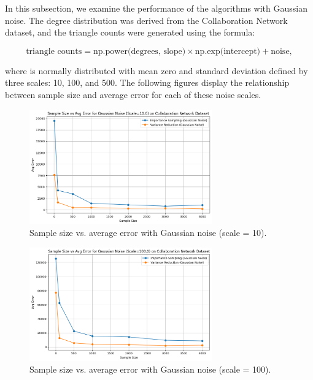 \documentclass[11pt]{article}
\begin{document}
In this subsection, we examine the performance of the algorithms with Gaussian noise. The degree distribution was derived from the Collaboration Network dataset, and the triangle counts were generated using the formula:

\[
\text{triangle counts} = \text{np.power(degrees, slope)} \times \text{np.exp(intercept)} + \text{noise},
\]

where  is normally distributed with mean zero and standard deviation defined by three scales: 10, 100, and 500. The following figures display the relationship between sample size and average error for each of these noise scales.

\begin{figure}[H]
    \centering
    \includegraphics[width=0.7\textwidth]{plots/simulated/percent_error_vs_sample_size_comparison_gaussian_10.0.png}
    \caption{Sample size vs. average error with Gaussian noise (scale = 10).}
    \label{fig:gaussian_noise_10}
\end{figure}

\begin{figure}[H]
    \centering
    \includegraphics[width=0.7\textwidth]{plots/simulated/percent_error_vs_sample_size_comparison_gaussian_100.0.png}
    \caption{Sample size vs. average error with Gaussian noise (scale = 100).}
    \label{fig:gaussian_noise_100}
\end{figure}
\end{document}
